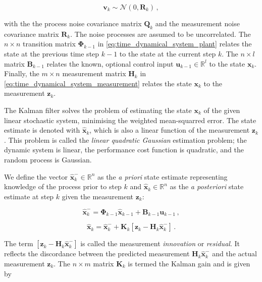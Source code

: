 \begin{equation}\label{eq:measurement_noise}
  \mathbf{v}_{k} \sim \mathcal{N}(0,\mathbf{R}_k)\,,
\end{equation}
 
\noindent
with the the process noise covariance matrix $\mathbf{Q}_k$ and the measurement noise covariance matrix $\mathbf{R}_k$. The noise processes are assumed to be uncorrelated. The $n\times n$ transition matrix $\bm{\Phi}_{k-1}$ in \ref{eq:time_dynamical_system_plant} relates the state at the previous time step $k-1$ to the state at the current step $k$. The $n\times l$ matrix $\mathbf{B}_{k-1}$ relates the known, optional control input $\mathbf{u}_{k-1} \in \mathbb{R}^l$ to the state $\mathbf{x}_k$. Finally, the $m\times n$ measurement matrix $\mathbf{H}_{k}$ in \ref{eq:time_dynamical_system_measurement} relates the state $\mathbf{x}_k$ to the measurement $\mathbf{z}_k$.

The Kalman filter solves the problem of estimating the state $\mathbf{x}_k$ of the given linear stochastic system, minimising the weighted mean-squarred error. The state estimate is denoted with $\hat{\mathbf{x}}_k$, which is also a linear function of the measurement $\mathbf{z}_k$. This problem is called the \emph{linear quadratic Gaussian} estimation problem; the dynamic system is linear, the performance cost function is quadratic, and the random process is Gaussian.

We define the vector $\hat{\mathbf{x}}^-_k \in \mathbb{R}^n$ as the \emph{a priori} state estimate representing knowledge of the process prior to step $k$ and $\hat{\mathbf{x}}_k \in \mathbb{R}^n$ as the \emph{a posteriori} state estimate at step $k$ given the measurement $\mathbf{z}_k$:

\begin{equation}\label{eq:apriori_estimate}
  \hat{\mathbf{x}}^-_k = \bm{\Phi}_{k-1}\hat{\mathbf{x}}_{k-1}+\mathbf{B}_{k-1}\mathbf{u}_{k-1}\,,
\end{equation}

\begin{equation}\label{eq:aposteriori_estimate}
  \hat{\mathbf{x}}_k = \hat{\mathbf{x}}^-_k + \mathbf{K}_{k}[\mathbf{z}_k-\mathbf{H}_{k}\hat{\mathbf{x}}^-_k]\,.
\end{equation}

\noindent
The term $[\mathbf{z}_k-\mathbf{H}_{k}\hat{\mathbf{x}}^-_k]$ is called the measurement \emph{innovation} or \emph{residual}. It reflects the discordance between the predicted measurement $\mathbf{H}_{k}\hat{\mathbf{x}}^-_k$ and the actual measurement $\mathbf{z}_k$. The $n\times m$ matrix $\mathbf{K}_{k}$ is termed the Kalman gain and is given by


